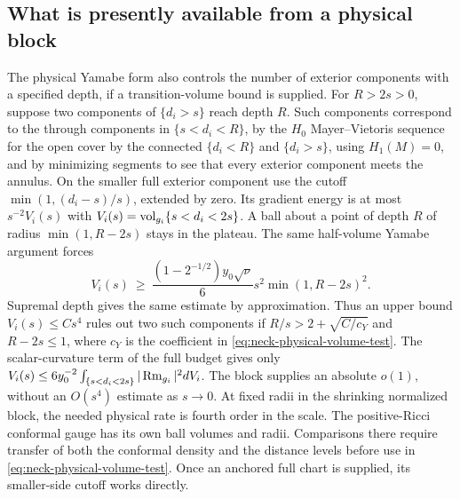 

\subsection{What is presently available from a physical block}

The physical Yamabe form also controls the number of exterior
components with a specified depth, if a transition-volume
bound is supplied. For \(R>2s>0\), suppose two components of
\(\{d_i>s\}\) reach depth \(R\). Such components correspond to
the through components in \(\{s<d_i<R\}\), by the
\(H_0\) Mayer--Vietoris sequence for the open cover by the
connected \(\{d_i<R\}\) and \(\{d_i>s\}\), using \(H_1(M)=0\),
and by minimizing segments to see that every exterior
component meets the annulus. On the smaller full exterior
component use the cutoff \(\min(1,(d_i-s)/s)\), extended by
zero. Its gradient energy is at most \(s^{-2}V_i(s)\) with
\(V_i(s)=\operatorname{vol}_{g_i}\{s<d_i<2s\}\). A ball about a point of
depth \(R\) of radius \(\min(1,R-2s)\) stays in the plateau.
The same half-volume Yamabe argument forces
\begin{equation}\label{eq:neck-physical-volume-test}
 V_i(s)\ \ge\ \frac{(1-2^{-1/2})y_0\sqrt\nu}{6}
                   s^2\min(1,R-2s)^2 .
\end{equation}
Supremal depth gives the same estimate by approximation. Thus
an upper bound \(V_i(s)\le C s^4\) rules out two such components
if \(R/s>2+\sqrt{C/c_Y}\) and \(R-2s\le1\), where \(c_Y\) is
the coefficient in \eqref{eq:neck-physical-volume-test}. The scalar-curvature
term of the full budget gives only
\(V_i(s)\le 6y_0^{-2}\int_{\{s<d_i<2s\}}|\operatorname{Rm}_{g_i}|^2dV_i\).
The block supplies an absolute \(o(1)\), without an \(O(s^4)\)
estimate as \(s\to0\). At fixed radii in the shrinking
normalized block, the needed physical rate is fourth order
in the scale. The positive-Ricci conformal gauge has its own
ball volumes and radii. Comparisons there require transfer of
both the conformal density and the distance levels before use
in \eqref{eq:neck-physical-volume-test}. Once an anchored full
chart is supplied, its smaller-side cutoff works directly.

